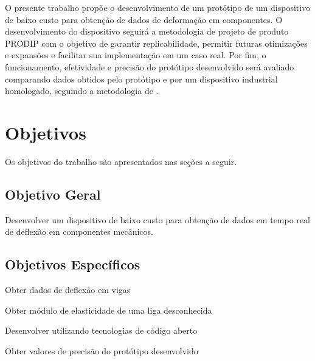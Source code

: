 O presente trabalho propõe o desenvolvimento de um protótipo de um dispositivo de baixo custo para obtenção de dados de deformação em componentes. O desenvolvimento do dispositivo seguirá a metodologia de projeto de produto PRODIP com o objetivo de garantir replicabilidade, permitir futuras otimizações e expansões e facilitar sua implementação em um caso real. Por fim, o funcionamento, efetividade e precisão do protótipo desenvolvido será avaliado comparando dados obtidos pelo protótipo e por um dispositivo industrial homologado, seguindo a metodologia de \autocite{Minela2017}.

\section{Objetivos}

Os objetivos do trabalho são apresentados nas seções a seguir.

\subsection{Objetivo Geral}

Desenvolver um dispositivo de baixo custo para obtenção de dados em tempo real de deflexão em componentes mecânicos.

\subsection{Objetivos Específicos}

Obter dados de deflexão em vigas

Obter módulo de elasticidade de uma liga desconhecida

Desenvolver utilizando tecnologias de código aberto

Obter valores de precisão do protótipo desenvolvido

